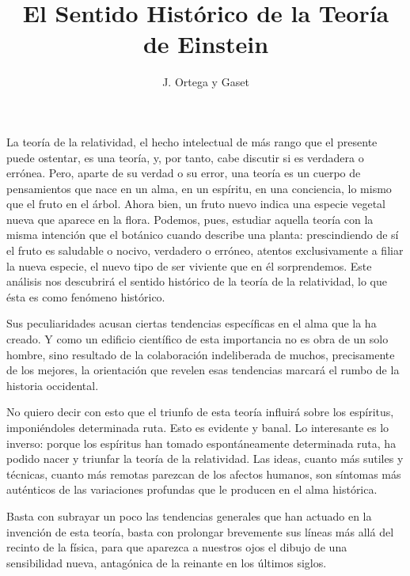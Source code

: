 \documentclass[a4paper, 12pt]{article}
\title{El Sentido Histórico de la Teoría de Einstein}
\author{J. Ortega y Gaset}
\date{}
\begin{document}
\begin{tcolorbox}[colback=blue!5!white,colframe=blue!75!black]

\vspace{-1.8cm}
\textbf \maketitle

\end{tcolorbox}

\bigskip







La teoría de la relatividad, el hecho intelectual de más rango que el
presente puede ostentar, es una teoría, y, por tanto, cabe discutir si es
verdadera o errónea. Pero, aparte de su verdad o su error, una teoría es
un cuerpo de pensamientos que nace en un alma, en un espíritu, en una
conciencia, lo mismo que el fruto en el árbol. Ahora bien, un fruto nuevo
indica una especie vegetal nueva que aparece en la flora. Podemos, pues,
estudiar aquella teoría con la misma intención que el botánico cuando
describe una planta: prescindiendo de sí el fruto es saludable o nocivo,
verdadero o erróneo, atentos exclusivamente a filiar la nueva especie, el
nuevo tipo de ser viviente que en él sorprendemos. Este análisis nos
descubrirá el sentido histórico de la teoría de la relatividad, lo que
ésta es como fenómeno histórico.

Sus peculiaridades acusan ciertas tendencias específicas en el alma que la
ha creado. Y como un edificio científico de esta importancia no es obra de
un solo hombre, sino resultado de la colaboración indeliberada de muchos,
precisamente de los mejores, la orientación que revelen esas tendencias
marcará el rumbo de la historia occidental.

No quiero decir con esto que el triunfo de esta teoría influirá sobre los
espíritus, imponiéndoles determinada ruta. Esto es evidente y banal. Lo
interesante es lo inverso: porque los espíritus han tomado espontáneamente
determinada ruta, ha podido nacer y triunfar la teoría de la relatividad.
Las ideas, cuanto más sutiles y técnicas, cuanto más remotas parezcan de
los afectos humanos, son síntomas más auténticos de las variaciones
profundas que le producen en el alma histórica.

Basta con subrayar un poco las tendencias generales que han actuado en la
invención de esta teoría, basta con prolongar brevemente sus líneas más
allá del recinto de la física, para que aparezca a nuestros ojos el dibujo
de una sensibilidad nueva, antagónica de la reinante en los últimos
siglos.
\end{document}
